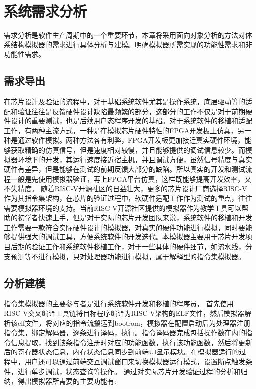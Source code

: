 
\chapter{系统需求分析}

需求分析是软件生产周期中的一个重要环节，本章将采用面向对象分析的方法对体系结构模拟器的需求进行具体分析与建模。明确模拟器所需实现的功能性需求和非功能性需求。

\section{需求导出}

在芯片设计及验证的流程中，对于基础系统软件尤其是操作系统，底层驱动等的适配和验证往往是反馈硬件设计缺陷最频繁的部分，这部分的工作不仅是对于前期硬件设计的重要测试，也是后续用户态程序开发的基础。对于系统软件的移植和适配工作，有两种主流方式，一种是在模拟芯片硬件特性的FPGA开发板上仿真，另一种是通过软件模拟。两种方法各有利弊，FPGA开发板更加接近真实硬件环境，能够获取精确的仿真信号，但是速度相对较慢，并且能够提供的调试信息较少。而模拟器环境下的开发，其运行速度接近宿主机，并且调试方便，虽然信号精度与真实硬件有差异，但是能够在测试的前期反馈大部分的缺陷。所以真实的开发和测试流程一般是先使用模拟器验证，再上FPGA平台仿真，这样既能够提高开发效率，又不失精度。
随着RISC-V开源社区的日益壮大，更多的芯片设计厂商选择RISC-V作为其指令集架构，在芯片的验证过程中，软硬件适配工作作为测试的重点，往往需要模拟器环境的支持。当前RISC-V开源社区提供的模拟器作为教学工具可以帮助的初学者快速上手，但是对于实际的芯片开发团队来说，系统软件的移植和开发工作需要一款符合实际硬件设计的模拟器，对真实的硬件功能进行模拟，同时要能够提供强大的调试工具，方便系统软件的开发迭代。本模拟器主要用于芯片开发项目后期的验证工作和系统软件移植工作，对于一些具体的硬件细节，如流水线，分支预测等不进行模拟，只对处理器功能进行模拟，属于解释型的指令集模拟器。


\section{分析建模}

指令集模拟器的主要参与者是进行系统软件开发和移植的程序员，
首先使用RISC-V交叉编译工具链将目标程序编译为RISC-V架构的ELF文件，然后模拟器解析该elf文件，将对应的指令流搬运到bootrom，模拟器在配置启动后为处理器注册指令集，绑定解码器，逐条进行译码，执行。指令译码器完成包括操作数在内的指令信息提取，找到该条指令注册时对应的功能函数，执行该功能函数，然后将更新后的寄存器状态信息，内存状态信息同步到前端UI显示模块。在模拟器运行的过程中，用户还可以通过前端交互调试窗口来切换模拟器运行模式，设置断点触发条件，进行单步调试，状态查询等操作。
通过对实际芯片开发验证过程的分析和归纳，得出模拟器所需要的主要功能有:


